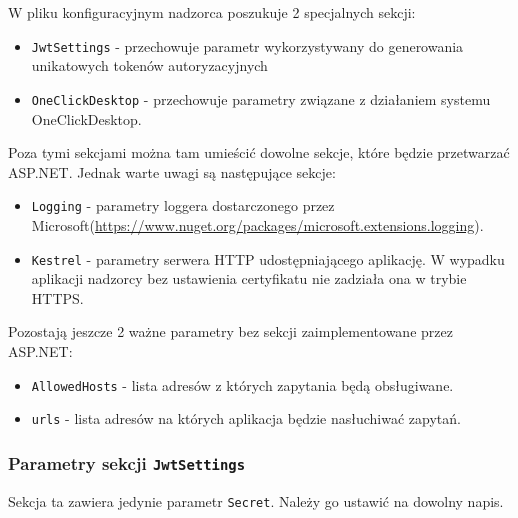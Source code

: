 \documentclass[../opis-rozwiazania.tex]{subfiles}
\begin{document}
W pliku konfiguracyjnym nadzorca poszukuje 2 specjalnych sekcji:
\begin{itemize}
	\item \texttt{JwtSettings} - przechowuje parametr wykorzystywany do generowania unikatowych tokenów autoryzacyjnych
	\item \texttt{OneClickDesktop} - przechowuje parametry związane z działaniem systemu OneClickDesktop.
\end{itemize}
Poza tymi sekcjami można tam umieścić dowolne sekcje, które będzie przetwarzać ASP.NET. %
Jednak warte uwagi są następujące sekcje:
\begin{itemize}
	\item \texttt{Logging} - parametry loggera dostarczonego przez Microsoft(\url{https://www.nuget.org/packages/microsoft.extensions.logging}).
	\item \texttt{Kestrel} - parametry serwera HTTP udostępniającego aplikację. W wypadku aplikacji nadzorcy bez ustawienia certyfikatu nie zadziała ona w trybie HTTPS.
\end{itemize}
\noindent
Pozostają jeszcze 2 ważne parametry bez sekcji zaimplementowane przez ASP.NET:
\begin{itemize}
	\item \texttt{AllowedHosts} - lista adresów z których zapytania będą obsługiwane.
	\item \texttt{urls} - lista adresów na których aplikacja będzie nasłuchiwać zapytań.
\end{itemize}

\subsubsection{Parametry sekcji \texttt{JwtSettings}}
Sekcja ta zawiera jedynie parametr \texttt{Secret}. Należy go ustawić na dowolny napis.
\end{document}
